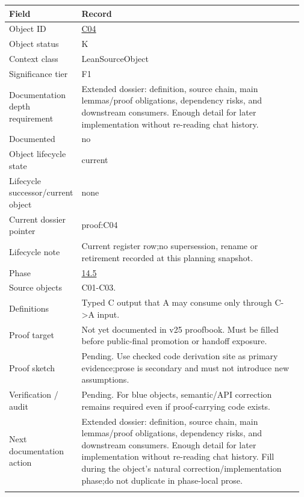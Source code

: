 \begin{longtable}{L{0.16\linewidth} L{0.81\linewidth}}
\hline
\textbf{Field} & \textbf{Record}\\
\hline
Object ID & \hyperlink{object-row-C04}{C04}\\
\hline\addlinespace[0.20em]
Object status & K\\
\hline\addlinespace[0.20em]
Context class & LeanSourceObject\\
\hline\addlinespace[0.20em]
Significance tier & F1\\
\hline\addlinespace[0.20em]
Documentation depth requirement & Extended dossier: definition, source chain, main lemmas/\allowbreak{}proof obligations, dependency risks, and downstream consumers. Enough detail for later implementation without re-reading chat history.\\
\hline\addlinespace[0.20em]
Documented & no\\
\hline\addlinespace[0.20em]
Object lifecycle state & current\\
\hline\addlinespace[0.20em]
Lifecycle successor/\allowbreak{}current object & none\\
\hline\addlinespace[0.20em]
Current dossier pointer & proof:C04\\
\hline\addlinespace[0.20em]
Lifecycle note & Current register row;\newline no supersession, rename or retirement recorded at this planning snapshot.\\
\hline\addlinespace[0.20em]
Phase & \hyperlink{phase-row-14-5}{14.5}\\
\hline\addlinespace[0.20em]
Source objects & C01-C03.\\
\hline\addlinespace[0.20em]
Definitions & Typed C output that A may consume only through C->A input.\\
\hline\addlinespace[0.20em]
Proof target & Not yet documented in v25 proofbook. Must be filled before public-final promotion or handoff exposure.\\
\hline\addlinespace[0.20em]
Proof sketch & Pending. Use checked code derivation site as primary evidence;\newline prose is secondary and must not introduce new assumptions.\\
\hline\addlinespace[0.20em]
Verification /\allowbreak{} audit & Pending. For blue objects, semantic/\allowbreak{}API correction remains required even if proof-carrying code exists.\\
\hline\addlinespace[0.20em]
Next documentation action & Extended dossier: definition, source chain, main lemmas/\allowbreak{}proof obligations, dependency risks, and downstream consumers. Enough detail for later implementation without re-reading chat history. Fill during the object's natural correction/\allowbreak{}implementation phase;\newline do not duplicate in phase-local prose.\\
\hline\addlinespace[0.20em]
\end{longtable}
